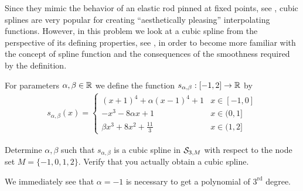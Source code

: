 
\begin{problem} \label{prb:CubicSplines}
  Since they mimic the behavior of an elastic rod pinned at fixed points, see
  , cubic splines are very popular for creating ``aesthetically
  pleasing'' interpolating functions. However, in this problem we look at a
  cubic spline from the perspective of its defining properties, see
  , in order to become more familiar with the concept of
  spline function and the consequences of the smoothness required %
  by the definition.

 For parameters $\alpha,\beta\in\mathbb{R}$ we define the function
  $s_{\alpha,\beta}:[-1,2]\to \mathbb{R}$ by
  \begin{gather}    \label{eq:ex_CubicSplines}
    s_{\alpha,\beta}(x) = \left\{\begin{array}{ll}
        (x+1)^4+\alpha(x-1)^4+1 & x\in[-1,0]\\
        -x^3-8\alpha x +1 &       x\in(0,1]\\
        \beta x^3+8x^2 + \frac{11}{3} & x\in(1,2]
      \end{array}\right.
  \end{gather}




\begin{subproblem}[2] \label{subprb:CubicSplines_1}     %
    Determine $\alpha,\beta$ such that $s_{\alpha,\beta}$ is a cubic spline in ${\cal S}_{3,M}$
    with respect to the node set $M=\{-1,0,1,2\}$.
    Verify that you actually obtain a cubic spline.


\begin{solution}
We immediately see that $\alpha=-1$ is necessary to get a polynomial of $3^{\text{rd}}$ degree.


\end{solution}
\end{subproblem}
\end{problem}
